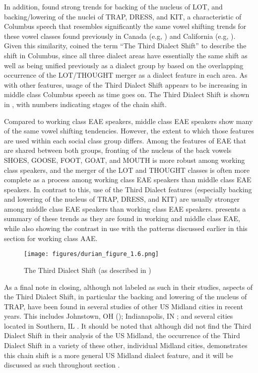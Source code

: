 \documentclass[output=paper,colorlinks,citecolor=brown]{langscibook}
\begin{document}
In addition, \citet{durian2012new} found strong trends for backing of the nucleus of LOT, and backing/lowering of the nuclei of TRAP, DRESS, and KIT, a characteristic of Columbus speech that resembles significantly the same vowel shifting trends for these vowel classes found previously in Canada (e.g, \citealt{ClarkeYoussef1995,boberg2005canadian,roeder2010canadian}) and California (e.g, \citealt{luthin1987story,kennedy2012chain,podesva2015country}). Given this similarity, \citet{durian2012new} coined the term ``The Third Dialect Shift'' to describe the shift in Columbus, since all three dialect areas have essentially the same shift as well as being unified previously as a dialect group by \citet{labov1991three} based on the overlapping occurrence of the LOT/THOUGHT merger as a dialect feature in each area. As with other features, usage of the Third Dialect Shift appears to be increasing in middle class Columbus speech as time goes on. The Third Dialect Shift is shown in , with numbers indicating stages of the chain shift.

Compared to working class EAE speakers, middle class EAE speakers show many of the same vowel shifting tendencies. However, the extent to which those features are used within each social class group differs. Among the features of EAE that are shared between both groups, fronting of the nucleus of the back vowels SHOES, GOOSE, FOOT, GOAT, and MOUTH is more robust among working class speakers, and the merger of the LOT and THOUGHT classes is often more complete as a process among working class EAE speakers than middle class EAE speakers. In contrast to this, use of the Third Dialect features (especially backing and lowering of the nucleus of TRAP, DRESS, and KIT) are usually stronger among middle class EAE speakers than working class EAE speakers.  presents a summary of these trends as they are found in working and middle class EAE, while also showing the contrast in use with the patterns discussed earlier in this section for working class AAE.

\begin{figure}
\texttt{[image: figures/durian\_figure\_1.6.png]}
\caption{ The Third Dialect Shift (as described in \citealt{durian2012new})}
\label{fig:durian:6}
 \end{figure}

As a final note in closing, although not labeled as such in their studies, aspects of the Third Dialect Shift, in particular the backing and lowering of the nucleus of TRAP, have been found in several studies of other US Midland cities in recent years. This includes Johnstown, OH  (\citealt{thomas1996sixthgrade}); Indianapolis, IN \citep{Fogle2008}; and several cities located in Southern, IL \citep{bigham2010correlation}. It should be noted that although \citet{labov2006atlas} did not find the Third Dialect Shift in their analysis of the US Midland, the occurrence of the Third Dialect Shift in a variety of these other, individual Midland cities, demonstrates this chain shift is a more general US Midland dialect feature, and it will be discussed as such throughout section .
\end{document}
